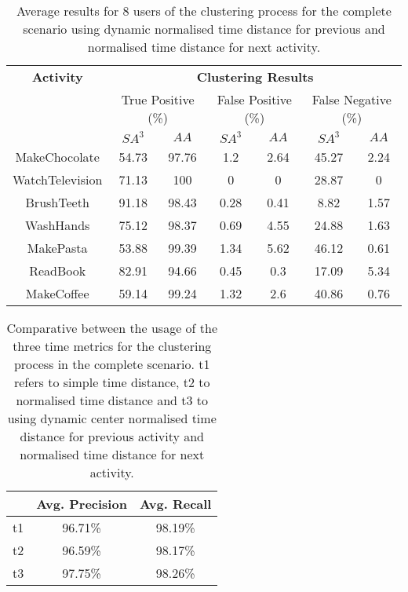 \begin{table}[htbp]\scriptsize
  \begin{center}
        \begin{tabular}{ccccccc}
            \hline            
            \textbf{Activity} & \multicolumn{6}{c}{\textbf{Clustering Results}} \\
             & \multicolumn{2}{c}{True Positive (\%)} & \multicolumn{2}{c}{False Positive (\%)} & \multicolumn{2}{c}{False Negative (\%)} \\
             & $SA^3$ & $AA$ & $SA^3$ & $AA$ & $SA^3$ & $AA$ \\
            \hline
            MakeChocolate   & 54.73 & 97.76 & 1.2  & 2.64 & 45.27 & 2.24 \\
	    WatchTelevision & 71.13 & 100   & 0    & 0    & 28.87 & 0    \\
	    BrushTeeth      & 91.18 & 98.43 & 0.28 & 0.41 & 8.82  & 1.57 \\
	    WashHands       & 75.12 & 98.37 & 0.69 & 4.55 & 24.88 & 1.63 \\
	    MakePasta       & 53.88 & 99.39 & 1.34 & 5.62 & 46.12 & 0.61 \\
	    ReadBook        & 82.91 & 94.66 & 0.45 & 0.3  & 17.09 & 5.34 \\
	    MakeCoffee      & 59.14 & 99.24 & 1.32 & 2.6  & 40.86 & 0.76 \\
            \hline
        \end{tabular}
        \caption{Average results for 8 users of the clustering process for the complete scenario using dynamic normalised time distance for previous and normalised time distance for next activity.}
        \label{tab-r-comp-t3}
   \end{center}
\end{table}

\begin{table}[htbp]\scriptsize
\begin{center}
 \begin{tabular}{ccc}
  \hline
   & Avg. Precision & Avg. Recall \\
  \hline
  t1 & 96.71\% & 98.19\% \\
  t2 & 96.59\% & 98.17\% \\
  t3 & 97.75\% & 98.26\% \\
  \hline
 \end{tabular}
 \caption{Comparative between the usage of the three time metrics for the clustering process in the complete scenario. t1 refers to simple time distance, t2 to normalised time distance and t3 to using dynamic center normalised time distance for previous activity and normalised time distance for next activity.}
 \label{tab-r-comparative-complete}
\end{center} 
\end{table}

